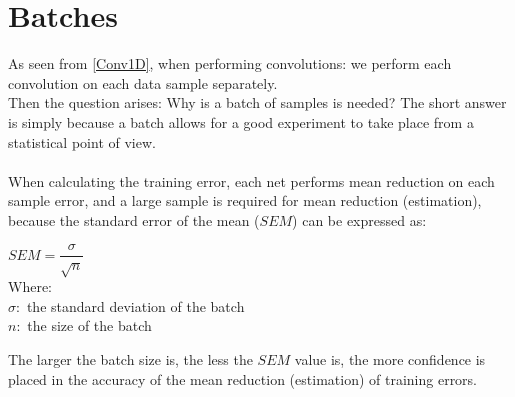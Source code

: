 \documentclass[a4paper, 12pt]{report}
\newcommand\tab[1][1cm]{\hspace*{#1}}
\begin{document}
\section{\textbf{Batches}}
As seen from \cref{Conv1D}, when performing convolutions: we perform each convolution on each data sample separately.\\
Then the question arises: Why is a batch of samples is needed?
The short answer is simply because a batch allows for a good experiment to take place from a statistical point of view.\\\\
When calculating the training error, each net performs mean reduction on each sample error, and a large sample is required for mean reduction (estimation), because the standard error of the mean ($ SEM $) can be expressed as:\\
\begin{center}
	\begin{minipage}{0.5\textwidth}
	$ SEM = \dfrac{\sigma}{\sqrt{n}} $\\
	Where:\\
	\tab \space \space $ \sigma: $ the standard deviation of the batch \\
	\tab \space \space $ n: $ the size of the batch 
\end{minipage}
\end{center}
The larger the batch size is, the less the $ SEM $ value is, the more confidence is placed in the accuracy of the mean reduction (estimation) of training errors.
\end{document}

